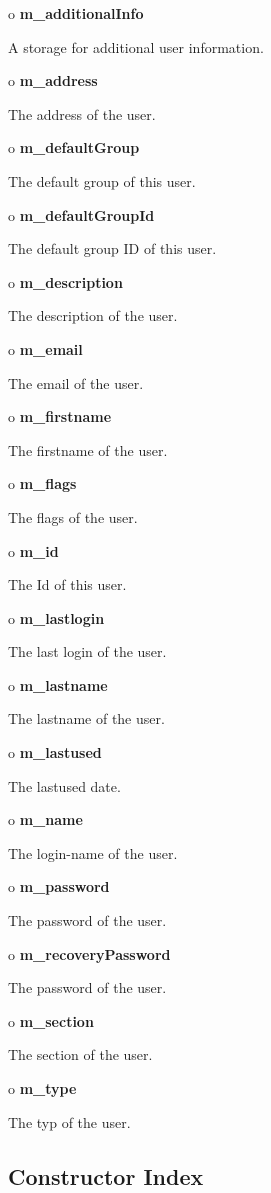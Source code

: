 \begin{description}
\item o {\bf m\_additionalInfo}  

A storage for additional user information.  
\item o {\bf m\_address}  

The address of the user.  
\item o {\bf m\_defaultGroup}  

The default group of this user.  
\item o {\bf m\_defaultGroupId}  

The default group ID of this user.  
\item o {\bf m\_description}  

The description of the user.  
\item o {\bf m\_email}  

The email of the user.  
\item o {\bf m\_firstname}  

The firstname of the user.  
\item o {\bf m\_flags}  

The flags of the user.  
\item o {\bf m\_id}  

The Id of this user.  
\item o {\bf m\_lastlogin}  

The last login of the user.  
\item o {\bf m\_lastname}  

The lastname of the user.  
\item o {\bf m\_lastused}  

The lastused date.  
\item o {\bf m\_name}  

The login-name of the user.  
\item o {\bf m\_password}  

The password of the user.  
\item o {\bf m\_recoveryPassword}  

The password of the user.  
\item o {\bf m\_section}  

The section of the user.  
\item o {\bf m\_type}  

The typ of the user. 
\end{description}

\subsection*{  Constructor Index }

